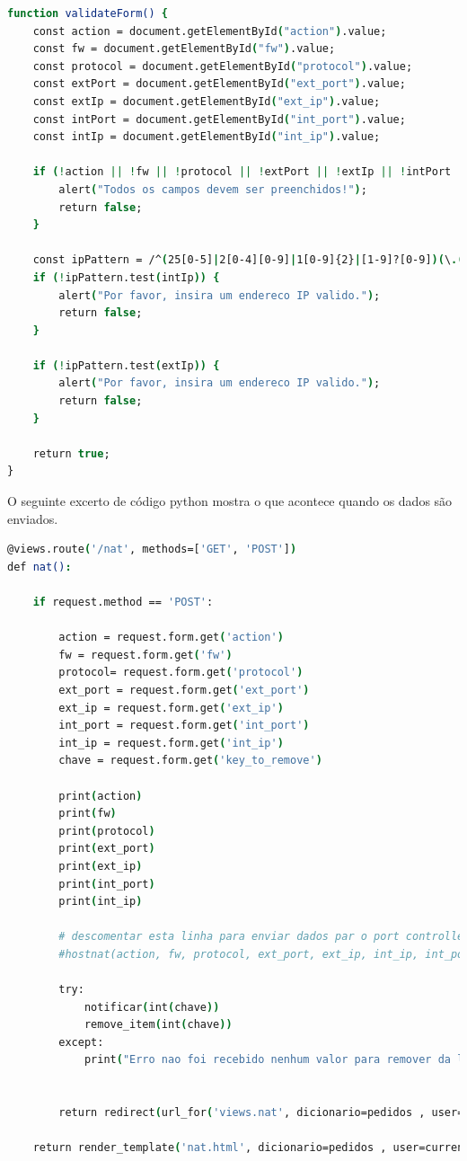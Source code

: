 \begin{lstlisting}[language=csh, caption={Código em javascript par verificar parâmetros da interface web}]
function validateForm() {
    const action = document.getElementById("action").value;
    const fw = document.getElementById("fw").value;
    const protocol = document.getElementById("protocol").value;
    const extPort = document.getElementById("ext_port").value;
    const extIp = document.getElementById("ext_ip").value;
    const intPort = document.getElementById("int_port").value;
    const intIp = document.getElementById("int_ip").value;

    if (!action || !fw || !protocol || !extPort || !extIp || !intPort || !intIp) {
        alert("Todos os campos devem ser preenchidos!");
        return false;
    }

    const ipPattern = /^(25[0-5]|2[0-4][0-9]|1[0-9]{2}|[1-9]?[0-9])(\.(25[0-5]|2[0-4][0-9]|1[0-9]{2}|[1-9]?[0-9])){3}$/;
    if (!ipPattern.test(intIp)) {
        alert("Por favor, insira um endereco IP valido.");
        return false;
    }

    if (!ipPattern.test(extIp)) {
        alert("Por favor, insira um endereco IP valido.");
        return false;
    }

    return true;
}
\end{lstlisting}




O seguinte excerto de código python mostra o que acontece quando os dados são enviados.
\begin{lstlisting}[language=csh, caption={Código em python da interface web}]
@views.route('/nat', methods=['GET', 'POST']) 
def nat():

    if request.method == 'POST':
            
        action = request.form.get('action')
        fw = request.form.get('fw')
        protocol= request.form.get('protocol')
        ext_port = request.form.get('ext_port')
        ext_ip = request.form.get('ext_ip')
        int_port = request.form.get('int_port')
        int_ip = request.form.get('int_ip')
        chave = request.form.get('key_to_remove')

        print(action)
        print(fw)
        print(protocol)
        print(ext_port)
        print(ext_ip)
        print(int_port)
        print(int_ip)

        # descomentar esta linha para enviar dados par o port controller
        #hostnat(action, fw, protocol, ext_port, ext_ip, int_ip, int_port)

        try:
            notificar(int(chave))
            remove_item(int(chave))
        except:
            print("Erro nao foi recebido nenhum valor para remover da lista de pedidos")

            
        return redirect(url_for('views.nat', dicionario=pedidos , user=current_user))

    return render_template('nat.html', dicionario=pedidos , user=current_user)
\end{lstlisting}

